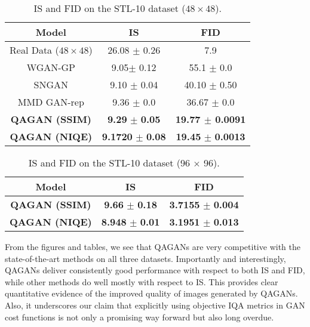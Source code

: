 \documentclass{article}
\begin{document}
\begin{table}[htbp]
\begin{center}
\caption{IS and FID on the STL-10 dataset ($48 \times 48$).}
 \label{tab:stl1048}
  \begin{tabular}{|c|c|c|}
    \hline
      {\bf{Model}} &
      {\bf{IS}} & {\bf{FID}}\\
      \hline
    Real Data ($48 \times 48$) &  26.08 $\pm$ 0.26 & 7.9 \\
      \hline
     WGAN-GP \cite{gulrajani2017improved}  & 9.05$\pm$ 0.12 & 55.1 $\pm$ 0.0\\
     
     \hline
     SNGAN \cite{miyato2018spectral} & 9.10 $\pm$ 0.04 & 40.10 $\pm$ 0.50 \\
      \hline
     MMD GAN-rep \cite{li2017mmd} & 9.36 $\pm$ 0.0 & 36.67 $\pm$ 0.0 \\
\hline
     \textbf{QAGAN (SSIM)} & \textbf{9.29} $\pm$ \textbf{0.05} & \textbf{19.77 $\pm$ 0.0091}\\
     \hline
     \textbf{QAGAN (NIQE)} & \textbf{9.1720} $\pm$ \textbf{0.08} & \textbf{19.45} $\pm$ \textbf{0.0013}\\
    \hline
    \end{tabular}
\end{center}
\end{table}
\begin{table}[htbp] 
\vspace{-0.1cm}
\begin{center}
\caption{IS and FID on the STL-10 dataset (96 $\times$ 96).}
\begin{tabular}{|c|c|c|}
    \hline
      {\bf{Model}} &
      {\bf{IS}} & {\bf{FID}}\\
\hline
    \textbf{QAGAN (SSIM)} & \textbf{9.66} $\pm$ \textbf{0.18}  & \textbf{3.7155} $\pm$ \textbf{0.004}\\
    \hline
    \textbf{QAGAN (NIQE)} & \textbf{8.948} $\pm$\textbf{ 0.01} & \textbf{3.1951} $\pm$ \textbf{0.013}\\
    \hline
    \end{tabular}
    \label{tab:stl1096}
   \vspace{-4mm}
  \end{center}
  \end{table}




From the figures and tables, we see that QAGANs are very competitive with the state-of-the-art methods on all three datasets. Importantly and interestingly, QAGANs deliver consistently good performance with respect to both IS and FID, while other methods do well mostly with respect to IS. This provides clear quantitative evidence of the improved quality of images generated by QAGANs. Also, it underscores our claim that explicitly using objective IQA metrics in GAN cost functions is not only a promising way forward but also long overdue. 
\end{document}
